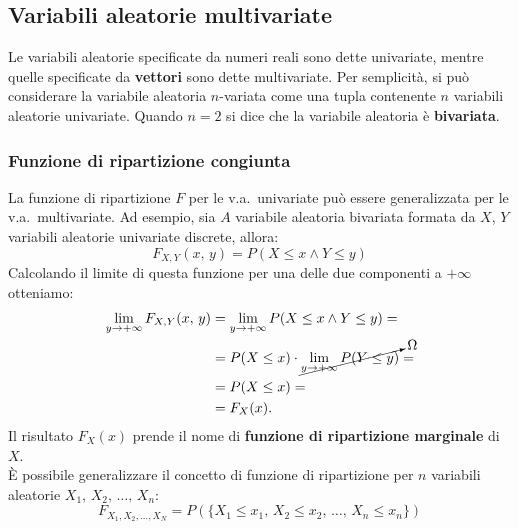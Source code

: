 \subsection{Variabili aleatorie multivariate}
Le variabili aleatorie specificate da numeri reali sono dette univariate, mentre quelle specificate da \textbf{vettori} sono dette multivariate.
Per semplicità, si può considerare la variabile aleatoria $n$-variata come una tupla contenente $n$ variabili aleatorie univariate. Quando $n=2$ si dice che la variabile aleatoria è \textbf{bivariata}.

\subsubsection{Funzione di ripartizione congiunta}
La funzione di ripartizione $F$ per le v.a.\ univariate può essere generalizzata per le v.a.\ multivariate.
Ad esempio, sia $A$ variabile aleatoria bivariata formata da $X$, $Y$ variabili aleatorie univariate discrete, allora:
$$
\boxed{
F_{X,Y}(x,\,y) = P(X \leq x \wedge Y \leq y)
}
$$
Calcolando il limite di questa funzione per una delle due componenti a $+\infty$ otteniamo:
\begin{align*}
\lim_{y \to +\infty} F_{X,Y}(x, \, y) &= 
\lim_{y \to +\infty} P(X \leq x \wedge Y \leq y) = \\ 
&= P(X \leq x) \cdot \cancelto{\Omega}{\lim_{y \to +\infty} P(Y \leq y)} = \\ 
&= P(X \leq x) = \\ 
&= F_X(x).
\end{align*}
Il risultato $F_X(x)$ prende il nome di \textbf{funzione di ripartizione marginale} di $X$. \\

\noindent È possibile generalizzare il concetto di funzione di ripartizione per $n$ variabili aleatorie $X_1, \, X_2, \, \dots, \, X_n$: \[
F_{X_1, X_2, \dots, X_N} = P(\{ X_1 \leq x_1, \, X_2 \leq x_2, \, \dots, \, X_n \leq x_n \})
\]

